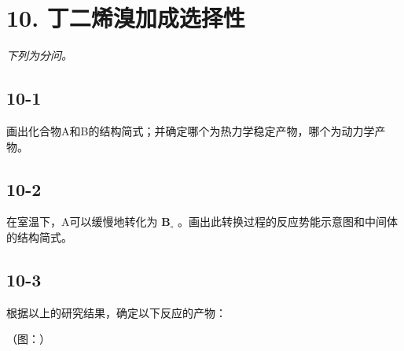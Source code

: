 \section*{10. 丁二烯溴加成选择性}
\textit{下列为分问。}

\subsection*{10-1}
画出化合物A和B的结构简式；并确定哪个为热⼒学稳定产物，哪个为动⼒学产物。

\subsection*{10-2}
在室温下，A可以缓慢地转化为 $\mathbf { B } _ { \circ }$ 。画出此转换过程的反应势能⽰意图和中间体的结构简式。

\subsection*{10-3}
根据以上的研究结果，确定以下反应的产物：

（图：）
